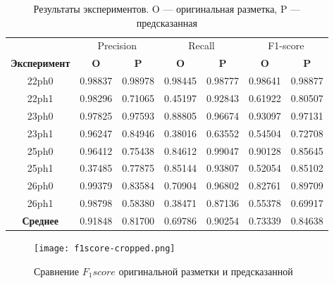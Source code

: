 \begin{table}[ht]
\centering
\label{tab:results}
	\begin{tabular}{ccccccc} \toprule
		& \multicolumn{2}{c}{Precision} & \multicolumn{2}{c}{Recall} & \multicolumn{2}{c}{F1-score} \\
		\textbf{Эксперимент}& \textbf{O} & \textbf{P}& \textbf{O} & \textbf{P}& \textbf{O} & \textbf{P} \\ \midrule
		22ph0               & 0.98837                & 0.98978               & 0.98445             & 0.98777            & 0.98641                  & 0.98877                  \\
		22ph1               & 0.98296                & 0.71065               & 0.45197             & 0.92843            & 0.61922                  & 0.80507                  \\
		23ph0               & 0.97825                & 0.97593               & 0.88805             & 0.96674            & 0.93097                  & 0.97131                  \\
		23ph1               & 0.96247                & 0.84946               & 0.38016             & 0.63552            & 0.54504                  & 0.72708                  \\
		25ph0               & 0.96412                & 0.75438               & 0.84612             & 0.99047            & 0.90128                  & 0.85645                  \\
		25ph1               & 0.37485                & 0.77875               & 0.85144             & 0.93807            & 0.52054                  & 0.85102                  \\
		26ph0               & 0.99379                & 0.83584               & 0.70904             & 0.96802            & 0.82761                  & 0.89709                  \\
		26ph1               & 0.98798                & 0.58380               & 0.38471             & 0.87136            & 0.55378                  & 0.69917                  \\ \midrule
		\textbf{Среднее}    & 0.91848                & 0.81700               & 0.69786             & 0.90254            & 0.73339                  & 0.84638                  \\ \bottomrule
	\end{tabular}
\caption{\centering Результаты экспериментов. O --- оригинальная разметка, P --- предсказанная}
\end{table}

\begin{figure}[!htb]
	\centering
	\texttt{[image: f1score-cropped.png]}
	\caption{Сравнение $F_1score$ оригинальной разметки и предсказанной}
	\label{fig:f1score-vs}
\end{figure}

